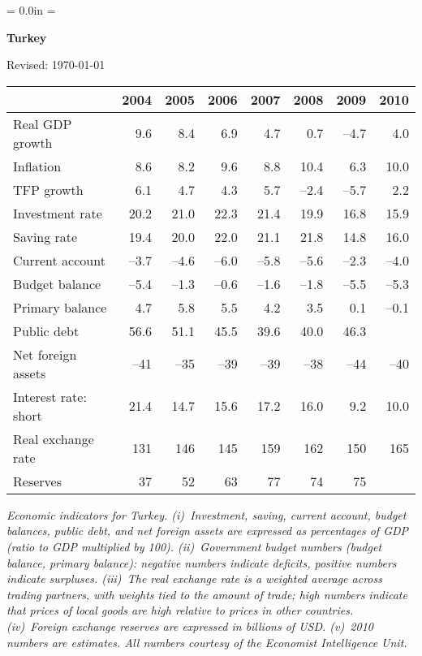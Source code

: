 \documentclass[letterpaper,12pt]{article}
\def\HeadName{Turkey}
\begin{document}
\parindent = 0.0in
\parskip = \bigskipamount
\thispagestyle{empty}%
\Head

\centerline{\large \bf \HeadName}%
\centerline{Revised:  \today}

\bigskip

\begin{center}
\begin{tabular}{lrrrrrrr}
\toprule 
         &  2004  &  2005  &  2006   & 2007  & 2008 &  2009  &  2010 \\%
\midrule 
Real GDP growth  & 9.6 & 8.4 & 6.9 & 4.7 & 0.7 & --4.7 & 4.0 \\
Inflation   & 8.6 & 8.2 & 9.6 & 8.8 & 10.4 & 6.3 & 10.0 \\
TFP growth  & 6.1 & 4.7 & 4.3 & 5.7 & --2.4 & --5.7 & 2.2 \\ 
Investment rate & 20.2 & 21.0 & 22.3 & 21.4 & 19.9 & 16.8 & 15.9 \\
Saving rate     & 19.4 & 20.0 & 22.0 & 21.1 & 21.8 & 14.8 & 16.0 \\
Current account & --3.7 & --4.6 & --6.0 & --5.8 & --5.6 & --2.3 & --4.0 \\
Budget balance  & --5.4 & --1.3 & --0.6 & --1.6 & --1.8 & --5.5 & --5.3 \\ 
Primary balance & 4.7 & 5.8 & 5.5 & 4.2 & 3.5 & 0.1 & --0.1 \\
Public debt      & 56.6 & 51.1 & 45.5 & 39.6 & 40.0 & 46.3 \\
Net foreign assets   & --41 & --35 & --39 & --39 & --38 & --44 & --40 \\%
Interest rate:  short & 21.4 & 14.7 & 15.6 & 17.2 & 16.0 & 9.2 & 10.0\\
Real exchange rate & 131 & 146 & 145 & 159 & 162 & 150 & 165 \\
Reserves           &  37 & 52 & 63 & 77 & 74 & 75 \\
\bottomrule 
\end{tabular}
\end{center}
{\it 
Economic indicators for Turkey.  
(i)~Investment, saving, current account, budget balances, 
public debt, and net foreign assets are expressed as 
percentages of GDP (ratio to GDP multiplied by 100).  
(ii)~Government budget numbers (budget balance, primary balance): 
negative numbers indicate deficits, 
positive numbers indicate surpluses.  
(iii)~The real exchange rate is a weighted average across trading partners, 
with weights tied to the amount of trade;
high numbers indicate that prices of local goods are high relative to 
prices in other countries.
(iv)~Foreign exchange reserves are expressed in billions of USD.  
(v)~2010 numbers are estimates.
All numbers courtesy of the Economist Intelligence Unit.} 
\end{document}

